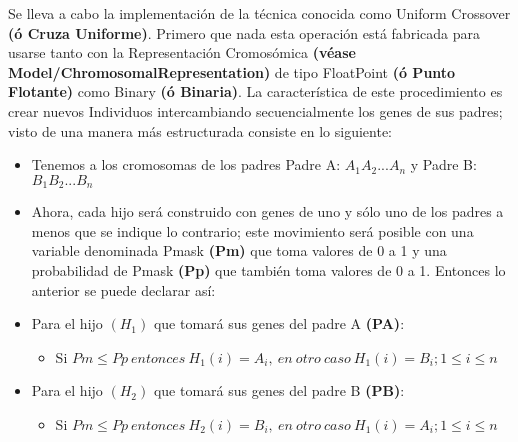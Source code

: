 \documentclass[class=report, crop=false]{standalone}
\begin{document}
\begin{fulllineitems}

\begin{DUlineblock}{0em}
\item[] Se lleva a cabo la implementación de la técnica conocida 
como Uniform Crossover \textbf{(ó Cruza Uniforme)}.\medskip\break
Primero que nada esta operación está fabricada para usarse 
tanto con la Representación Cromosómica \textbf{(véase Model/ChromosomalRepresentation)}
de tipo FloatPoint \textbf{(ó Punto Flotante)} como Binary 
\textbf{(ó Binaria)}.\break
La característica de este procedimiento es crear nuevos Individuos 
intercambiando secuencialmente los genes de sus padres; visto 
de una manera más estructurada consiste en lo siguiente:

\begin{itemize}
\item Tenemos a los cromosomas de los padres Padre A: \(A_1A_2...A_n\) y Padre B: \(B_1B_2...B_n\)
\item Ahora, cada hijo será construido con genes de uno y sólo uno de los padres a menos que se indique lo contrario; este movimiento será posible con una variable denominada Pmask \textbf{(Pm)} que toma valores de 0 a 1 y una probabilidad de Pmask \textbf{(Pp)} que también toma valores de 0 a 1. Entonces lo anterior se puede declarar así:
\item Para el hijo \((H_1)\) que tomará sus genes del padre A \textbf{(PA)}:
      \begin{itemize}
      \item Si \(Pm \leqslant Pp\ entonces\ H_1(i) = A_i,\ en\ otro\ caso\ H_1(i) = B_i; 1 \leqslant i \leqslant n\)
      \end{itemize}
\item Para el hijo \((H_2)\) que tomará sus genes del padre B \textbf{(PB)}:
      \begin{itemize}
      \item Si \(Pm \leqslant Pp\ entonces\ H_2(i) = B_i,\ en\ otro\ caso\ H_1(i) = A_i; 1 \leqslant i \leqslant n\)
      \end{itemize}
\end{itemize}

\end{DUlineblock}

\end{fulllineitems}

\end{document}

